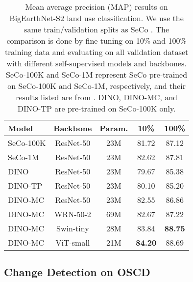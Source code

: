 \documentclass[10pt,twocolumn,letterpaper]{article}
\begin{document}
\begin{table}
  \centering
  \begin{tabular}{lcccc}
    \toprule
    Model & Backbone & Param. & 10\% & 100\% \\
    \midrule
    SeCo-100K & ResNet-50 & 23M & 81.72 & 87.12 \\
    SeCo-1M & ResNet-50 & 23M & 82.62 & 87.81 \\
    \midrule
    DINO & ResNet-50 & 23M & 79.67 & 85.38 \\
    DINO-TP  & ResNet-50 & 23M & 80.10 & 85.20 \\
    DINO-MC  & ResNet-50 & 23M & 82.55 & 86.86 \\
    DINO-MC  & WRN-50-2 & 69M & 82.67 & 87.22 \\
    DINO-MC & Swin-tiny & 28M & 83.84 & \textbf{88.75} \\
    DINO-MC  & ViT-small & 21M & \textbf{84.20} & 88.69 \\
    \bottomrule
  \end{tabular}
  \caption{Mean average precision (MAP) results on BigEarthNet-S2 land use classification. 
  We use the same train/validation splits as SeCo \cite{manas2021seasonal}.
  The comparison is done by fine-tuning on 10\% and 100\% training data and evaluating on all validation dataset with different self-supervised models and backbones.
  SeCo-100K and SeCo-1M represent SeCo pre-trained on SeCo-100K and SeCo-1M, respectively, and their results listed are from \cite{manas2021seasonal}.
  DINO, DINO-MC, and DINO-TP are pre-trained on SeCo-100K only.
  }
  \label{table:BigEarthNet_results}
\end{table}

\subsection{Change Detection on OSCD}
\end{document}
